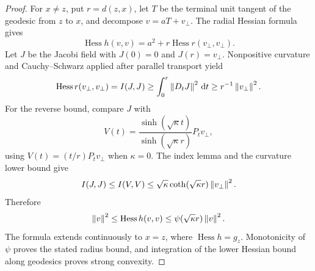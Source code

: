 \begin{proof}
For \(x\ne z\), put \(r=d(z,x)\), let \(T\) be the terminal unit tangent
of the geodesic from \(z\) to \(x\), and decompose
\(v=aT+v_\perp\).  The radial Hessian formula gives
\[
  \operatorname{Hess}h(v,v)
  =a^2+r\operatorname{Hess}r(v_\perp,v_\perp).
\]
Let \(J\) be the Jacobi field with \(J(0)=0\) and
\(J(r)=v_\perp\).  Nonpositive curvature and Cauchy--Schwarz applied after
parallel transport yield
\[
  \operatorname{Hess}r(v_\perp,v_\perp)=I(J,J)
  \ge\int_0^r\left\lVert D_tJ\right\rVert^2\,\mathrm{d} t
  \ge r^{-1}\left\lVert v_\perp\right\rVert^2.
\]
For the reverse bound, compare \(J\) with
\[
  V(t)=\frac{\sinh(\sqrt\kappa t)}
  {\sinh(\sqrt\kappa r)}P_tv_\perp,
\]
using \(V(t)=(t/r)P_tv_\perp\) when \(\kappa=0\).  The index lemma and the
curvature lower bound give
\[
  I(J,J)\le I(V,V)
  \le\sqrt\kappa\coth(\sqrt\kappa r)\left\lVert v_\perp\right\rVert^2.
\]
Therefore
\[
  \left\lVert v\right\rVert^2\le\operatorname{Hess}h(v,v)
  \le\psi(\sqrt\kappa r)\left\lVert v\right\rVert^2.
\]
The formula extends continuously to \(x=z\), where
\(\operatorname{Hess}h=g_z\).  Monotonicity of \(\psi\) proves the stated
radius bound, and integration of the lower Hessian bound along geodesics
proves strong convexity.
\end{proof}

